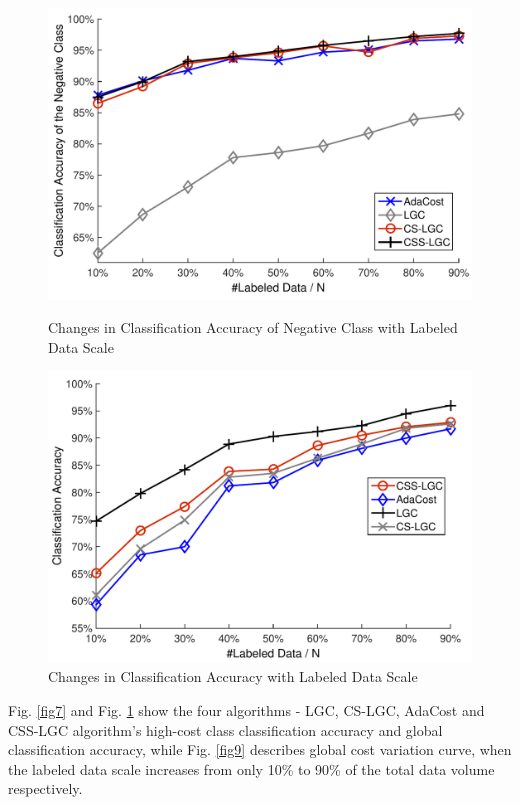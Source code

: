 \documentclass{svjour3}                     %
\begin{document}
\begin{figure}[H]
\begin{minipage}[t]{0.5\linewidth}
\includegraphics[width=\textwidth]{plot/fig7.pdf}
\caption{Changes in Classification Accuracy of Negative Class with Labeled Data Scale} \label{fig7}
\end{minipage}
\begin{minipage}[t]{0.5\linewidth}
\includegraphics[width=\textwidth]{plot/fig8.pdf}
\caption{Changes in Classification Accuracy with Labeled Data Scale} \label{fig8}
\end{minipage}
\end{figure}

Fig. \ref{fig7} and Fig. \ref{fig8} show the four algorithms - LGC, CS-LGC, AdaCost and CSS-LGC algorithm's high-cost class classification accuracy and global classification accuracy, while Fig. \ref{fig9} describes global cost variation curve, when the labeled data scale increases from only 10\% to 90\% of the total data volume respectively.
\end{document}
